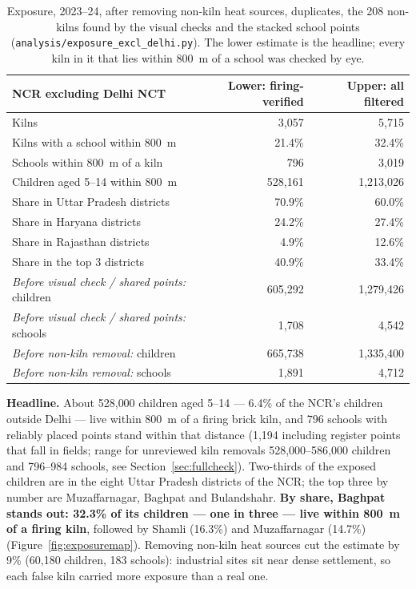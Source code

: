 \documentclass[11pt,a4paper]{article}
\begin{document}
\begin{table}[H]
\centering\small
\begin{tabular}{@{}lrr@{}}
\toprule
NCR excluding Delhi NCT & Lower: firing-verified & Upper: all filtered \\
\midrule
Kilns                                  & 3{,}057   & 5{,}715 \\
Kilns with a school within 800~m       & 21.4\%    & 32.4\% \\
Schools within 800~m of a kiln         & 796       & 3{,}019 \\
Children aged 5--14 within 800~m       & 528{,}161 & 1{,}213{,}026 \\
Share in Uttar Pradesh districts       & 70.9\%    & 60.0\% \\
Share in Haryana districts             & 24.2\%    & 27.4\% \\
Share in Rajasthan districts           &  4.9\%    & 12.6\% \\
Share in the top 3 districts           & 40.9\%    & 33.4\% \\
\midrule
\emph{Before visual check / shared points:} children & 605{,}292 & 1{,}279{,}426 \\
\emph{Before visual check / shared points:} schools  & 1{,}708   & 4{,}542 \\
\emph{Before non-kiln removal:} children & 665{,}738 & 1{,}335{,}400 \\
\emph{Before non-kiln removal:} schools  & 1{,}891   & 4{,}712 \\
\bottomrule
\end{tabular}
\caption{Exposure, 2023--24, after removing non-kiln heat sources, duplicates,
the 208 non-kilns found by the visual checks and the stacked school points
(\texttt{analysis/exposure\_excl\_delhi.py}). The lower estimate is the
headline; every kiln in it that lies within 800~m of a school was checked by eye.}
\end{table}

\textbf{Headline.} About 528{,}000 children aged 5--14 --- 6.4\% of the
NCR's children outside Delhi --- live within 800~m of a firing brick kiln, and
796 schools with reliably placed points stand within that distance (1{,}194 including register points that fall in fields; range for unreviewed kiln removals 528{,}000--586{,}000 children and 796--984 schools, see Section~\ref{sec:fullcheck}).
Two-thirds of the exposed children are in the eight Uttar Pradesh districts of
the NCR; the top three by number are Muzaffarnagar, Baghpat and Bulandshahr.
\textbf{By share, Baghpat stands out: 32.3\% of its children --- one in three
--- live within 800~m of a firing kiln}, followed by Shamli (16.3\%) and
Muzaffarnagar (14.7\%) (Figure~\ref{fig:exposuremap}). Removing non-kiln heat
sources cut the estimate by 9\% (60{,}180 children, 183 schools): industrial
sites sit near dense settlement, so each false kiln carried more exposure than a
real one.
\end{document}
